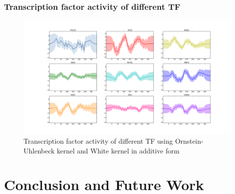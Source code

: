 \documentclass{beamer}
\begin{document}
\begin{frame}
\begin{columns}[c]
\end{columns}

\end{frame}


\begin{frame}
\frametitle{Transcription factor activity of different TF}
\begin{figure}[]
	\centering
		\includegraphics[width=\textwidth,keepaspectratio]{diagrams/OUWh9TF_Title.png}
	\caption[Transcription factor activity of different TF using Ornstein-Uhlenbeck kernel and White kernel]
		{Transcription factor activity of different TF using Ornstein-Uhlenbeck kernel and 
		White kernel in additive form}
	\label{fig:TFA_of_20TF}
\end{figure}

\end{frame}
\section{Conclusion and Future Work}
\end{document}
